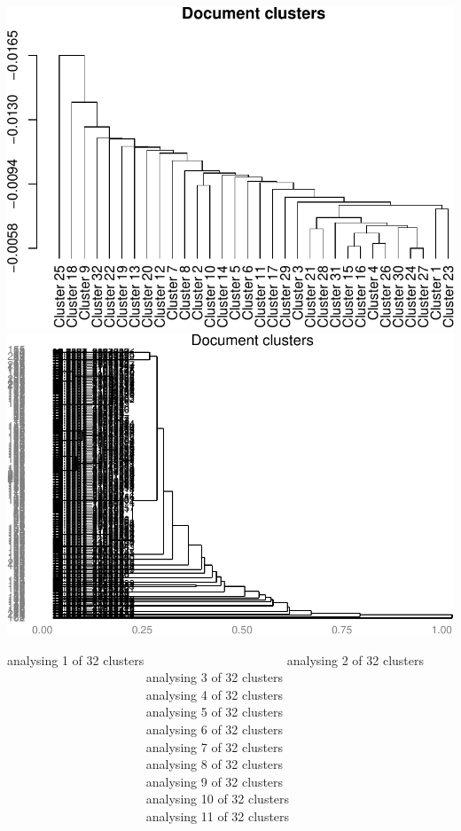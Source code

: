 \documentclass[10pt]{article}
\newenvironment{CodeChunk}{}{}
\begin{document}
\begin{CodeChunk}
\begin{CodeChunk}
\includegraphics{509Assignment_files/figure-latex/onegram3-15} 
\includegraphics{509Assignment_files/figure-latex/onegram3-16} \begin{CodeOutput}
analysing 1 of 32 clusters
analysing 2 of 32 clusters
analysing 3 of 32 clusters
analysing 4 of 32 clusters
analysing 5 of 32 clusters
analysing 6 of 32 clusters
analysing 7 of 32 clusters
analysing 8 of 32 clusters
analysing 9 of 32 clusters
analysing 10 of 32 clusters
analysing 11 of 32 clusters

\end{CodeOutput}
\end{CodeChunk}
\end{CodeChunk}
\end{document}
